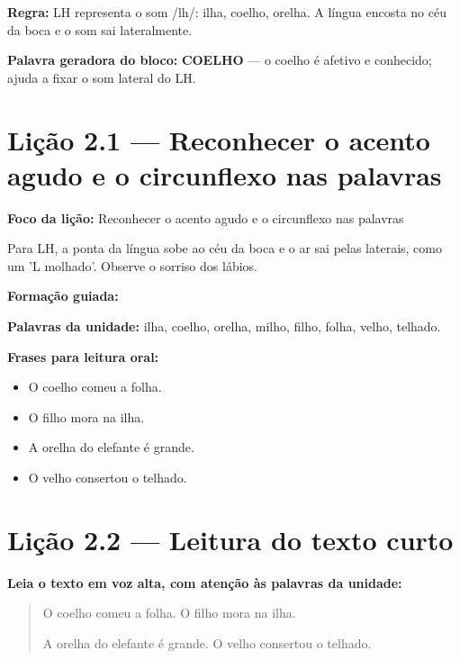 \textbf{Regra:} LH representa o som /lh/: ilha, coelho, orelha. A língua encosta no céu da boca e o som sai lateralmente.

\textbf{Palavra geradora do bloco:} \textbf{COELHO} --- o coelho é afetivo e conhecido; ajuda a fixar o som lateral do LH.

\section{Lição 2.1 --- Reconhecer o acento agudo e o circunflexo nas palavras}

\textbf{Foco da lição:} Reconhecer o acento agudo e o circunflexo nas palavras


\begin{boquinha}
Para LH, a ponta da língua sobe ao céu da boca e o ar sai pelas laterais, como um 'L molhado'. Observe o sorriso dos lábios.
\end{boquinha}

\noindent\textbf{Formação guiada:}

\begin{center}
\end{center}

\noindent\textbf{Palavras da unidade:} ilha, coelho, orelha, milho, filho, folha, velho, telhado.

\noindent\textbf{Frases para leitura oral:}
\begin{itemize}[leftmargin=1.6em]
  \item O coelho comeu a folha.
  \item O filho mora na ilha.
  \item A orelha do elefante é grande.
  \item O velho consertou o telhado.
\end{itemize}

\section{Lição 2.2 --- Leitura do texto curto}

\noindent\textbf{Leia o texto em voz alta, com atenção às palavras da unidade:}


\begin{quote}
O coelho comeu a folha. O filho mora na ilha.

A orelha do elefante é grande. O velho consertou o telhado.
\end{quote}

